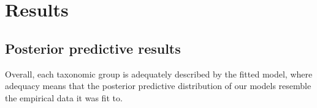 \documentclass[12pt,letterpaper]{article}
\begin{document}
\section{Results}

\subsection{Posterior predictive results}



Overall, each taxonomic group is adequately described by the fitted model, where adequacy means that the posterior predictive distribution of our models resemble the empirical data it was fit to. 
\end{document}
